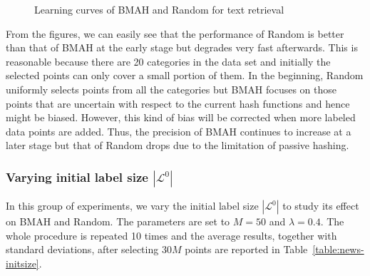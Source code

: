 \begin{figure}[htb]
\vspace{-1.5cm}
\caption{Learning curves of \mbox{BMAH} and \mbox{Random} for text retrieval}
\label{fig:apt-news-24b}
\end{figure}

From the figures, we can easily see that the performance of \mbox{Random} is better than that of \mbox{BMAH} at the early stage but degrades very fast afterwards. This is reasonable because there are 20 categories in the data set and initially the selected points can only cover a small portion of them. In the beginning, \mbox{Random} uniformly selects points from all the categories but \mbox{BMAH} focuses on those points that are uncertain with respect to the current hash functions and hence might be biased. However, this kind of bias will be corrected when more labeled data points are added. Thus, the precision of \mbox{BMAH} continues to increase at a later stage but that of \mbox{Random} drops due to the limitation of passive hashing.


\subsubsection{Varying initial label size $|\mathcal{L}^{0}|$}
\label{section:comp-initsize-news}
In this group of experiments, we vary the initial label size $|\mathcal{L}^0|$ to study its effect on \mbox{BMAH} and \mbox{Random}. The parameters are set to $M=50$ and $\lambda = 0.4$. The whole procedure is repeated 10 times and the average results, together with standard deviations, after selecting $30M$ points are reported in Table~\ref{table:news-initsize}.

